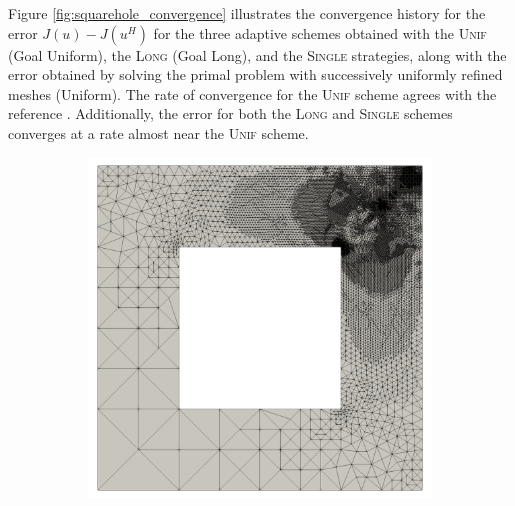 Figure \ref{fig:squarehole_convergence} illustrates the convergence
history for the error $J(u) - J(u^H)$ for the three adaptive schemes
obtained with the \textsc{Unif} (Goal Uniform), the \textsc{Long}
(Goal Long), and the \textsc{Single} strategies,
along with the error obtained by solving the primal problem with
successively uniformly refined meshes (Uniform). The rate of
convergence for the \textsc{Unif} scheme agrees with the
reference \cite{dealiistep14}. Additionally, the error for
both the \textsc{Long} and \textsc{Single} schemes converges at a
rate almost near the \textsc{Unif} scheme.

%
\begin{figure}[ht!]
\centering
\begin{subfigure}{.5\textwidth}
\centering
\includegraphics[width=.99\linewidth]{img/refine_squarehole_unif.png}
\end{subfigure}%
\begin{subfigure}{0.5\textwidth}
\centering

\end{subfigure}
\end{figure}
